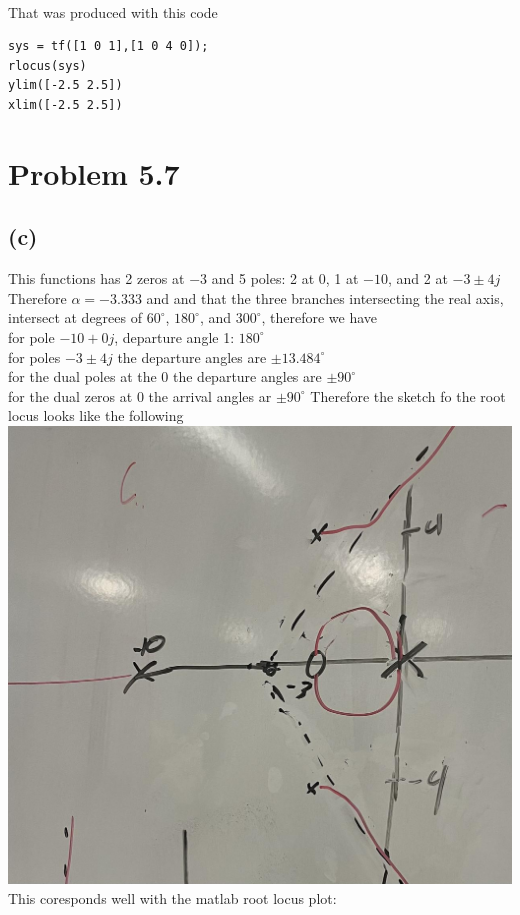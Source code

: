 \documentclass[12pt]{article}
\begin{document}
\\That was produced with this code
\begin{verbatim}
sys = tf([1 0 1],[1 0 4 0]);
rlocus(sys)
ylim([-2.5 2.5])
xlim([-2.5 2.5])
\end{verbatim}
\section*{Problem 5.7}
\subsection*{(c)}
This functions has 2 zeros at $-3$ and 5 poles: 2 at $0$, 1 at $-10$, and 2 at $-3\pm4j$
Therefore $\alpha=-3.333$ and and that the three branches intersecting the real axis, intersect at degrees of
$60^{\circ}$, $180^{\circ}$, and $300^{\circ}$,
therefore we have
\\for pole $-10+0j$, departure angle 1: $180^{\circ}$
\\for poles $-3\pm4j$ the departure angles are $\pm13.484^{\circ}$
\\for the dual poles at the $0$ the departure angles are $\pm90^{\circ}$
\\for the dual zeros at $0$ the arrival angles ar $\pm90^{\circ}$
Therefore the sketch fo the root locus looks like the following
\\
\includegraphics[scale=.15]{Problem2Sketch1.jpg}
\\This coresponds well with the matlab root locus plot:\\
\end{document}
